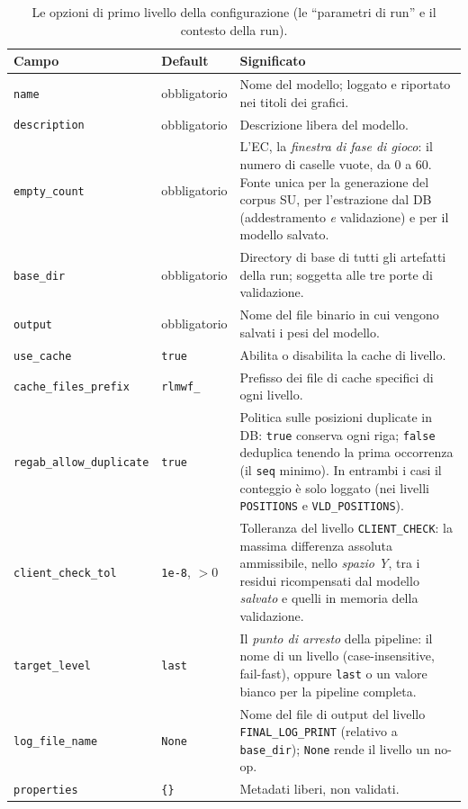 \begin{table}[htbp]
\centering
\small
\begin{tabularx}{\textwidth}{@{}llX@{}}
\toprule
Campo & Default & Significato \\
\midrule
\texttt{name}              & obbligatorio & Nome del modello; loggato e riportato nei titoli dei grafici. \\
\texttt{description}      & obbligatorio & Descrizione libera del modello. \\
\texttt{empty\_count}     & obbligatorio & L'EC, la \emph{finestra di fase di gioco}: il numero di caselle vuote, da 0 a 60. Fonte unica per la generazione del corpus SU, per l'estrazione dal DB (addestramento \emph{e} validazione) e per il modello salvato. \\
\texttt{base\_dir}        & obbligatorio & Directory di base di tutti gli artefatti della run; soggetta alle tre porte di validazione. \\
\texttt{output}           & obbligatorio & Nome del file binario in cui vengono salvati i pesi del modello. \\
\texttt{use\_cache}       & \texttt{true}  & Abilita o disabilita la cache di livello. \\
\texttt{cache\_files\_prefix} & \texttt{rlmwf\_} & Prefisso dei file di cache specifici di ogni livello. \\
\texttt{regab\_allow\_duplicate} & \texttt{true} & Politica sulle posizioni duplicate in DB: \texttt{true} conserva ogni riga; \texttt{false} deduplica tenendo la prima occorrenza (il \texttt{seq} minimo). In entrambi i casi il conteggio è solo loggato (nei livelli \texttt{POSITIONS} e \texttt{VLD\_POSITIONS}). \\
\texttt{client\_check\_tol} & \texttt{1e-8}, $>0$ & Tolleranza del livello \texttt{CLIENT\_CHECK}: la massima differenza assoluta ammissibile, nello \emph{spazio Y}, tra i residui ricompensati dal modello \emph{salvato} e quelli in memoria della validazione. \\
\texttt{target\_level}    & \texttt{last} & Il \emph{punto di arresto} della pipeline: il nome di un livello (case-insensitive, fail-fast), oppure \texttt{last} o un valore bianco per la pipeline completa. \\
\texttt{log\_file\_name}  & \texttt{None} & Nome del file di output del livello \texttt{FINAL\_LOG\_PRINT} (relativo a \texttt{base\_dir}); \texttt{None} rende il livello un no-op. \\
\texttt{properties}       & \texttt{\{\}} & Metadati liberi, non validati. \\
\bottomrule
\end{tabularx}
\caption{Le opzioni di primo livello della configurazione (le ``parametri di run'' e il contesto della run).}
\label{tab:setup-run}
\end{table}

